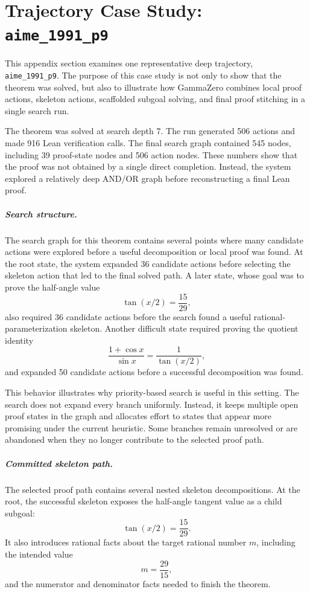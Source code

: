 \chapter{Trajectory Case Study: \texttt{aime\_1991\_p9}}
\label{app:case-study-aime-1991-p9}

This appendix section examines one representative deep trajectory, \texttt{aime\_1991\_p9}. The purpose
of this case study is not only to show that the theorem was solved, but also to illustrate how GammaZero
combines local proof actions, skeleton actions, scaffolded subgoal solving, and final proof stitching in a
single search run.

The theorem was solved at search depth 7. The run generated 506 actions and made 916 Lean verification
calls. The final search graph contained 545 nodes, including 39 proof-state nodes and 506 action nodes.
These numbers show that the proof was not obtained by a single direct completion. Instead, the system
explored a relatively deep AND/OR graph before reconstructing a final Lean proof.

\paragraph{Search structure.}
The search graph for this theorem contains several points where many candidate actions were explored before a useful decomposition or local proof was found. At the root state, the system expanded 36 candidate actions before selecting the skeleton action that led to the final solved path. A later state, whose goal was to prove the half-angle value
\[
\tan(x/2) = \frac{15}{29},
\]
also required 36 candidate actions before the search found a useful rational-parameterization skeleton. Another difficult state required proving the quotient identity
\[
\frac{1+\cos x}{\sin x} = \frac{1}{\tan(x/2)},
\]
and expanded 50 candidate actions before a successful decomposition was found.

This behavior illustrates why priority-based search is useful in this setting. The search does not expand every branch uniformly. Instead, it keeps multiple open proof states in the graph and allocates effort to states that appear more promising under the current heuristic. Some branches remain unresolved or are abandoned when they no longer contribute to the selected proof path.

\paragraph{Committed skeleton path.}
The selected proof path contains several nested skeleton decompositions. At the root, the successful skeleton exposes the half-angle tangent value as a child subgoal:
\[
\tan(x/2) = \frac{15}{29}.
\]
It also introduces rational facts about the target rational number \(m\), including the intended value
\[
m = \frac{29}{15},
\]
and the numerator and denominator facts needed to finish the theorem.

